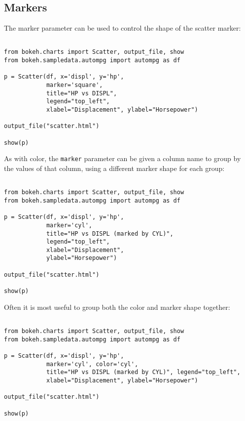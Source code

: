 \documentclass[a4paper,12pt]{article}
\begin{document}
\subsection{Markers}
The marker parameter can be used to control the shape of the scatter marker:
\begin{framed}
\begin{verbatim}

from bokeh.charts import Scatter, output_file, show
from bokeh.sampledata.autompg import autompg as df

p = Scatter(df, x='displ', y='hp', 
            marker='square',
            title="HP vs DISPL", 
            legend="top_left",
            xlabel="Displacement", ylabel="Horsepower")

output_file("scatter.html")

show(p)
\end{verbatim}
\end{framed}

As with color, the \texttt{marker} parameter can be given a column name to group by the values of that column, using a different marker shape for each group:
\begin{framed}
\begin{verbatim}

from bokeh.charts import Scatter, output_file, show
from bokeh.sampledata.autompg import autompg as df

p = Scatter(df, x='displ', y='hp', 
            marker='cyl',   
            title="HP vs DISPL (marked by CYL)",
            legend="top_left",
            xlabel="Displacement",
            ylabel="Horsepower")

output_file("scatter.html")

show(p)
\end{verbatim}
\end{framed}
	
Often it is most useful to group both the color and marker shape together:
\begin{framed}
\begin{verbatim}

from bokeh.charts import Scatter, output_file, show
from bokeh.sampledata.autompg import autompg as df

p = Scatter(df, x='displ', y='hp', 
            marker='cyl', color='cyl',
            title="HP vs DISPL (marked by CYL)", legend="top_left",
            xlabel="Displacement", ylabel="Horsepower")

output_file("scatter.html")

show(p)
\end{verbatim}
\end{framed}
\end{document}
